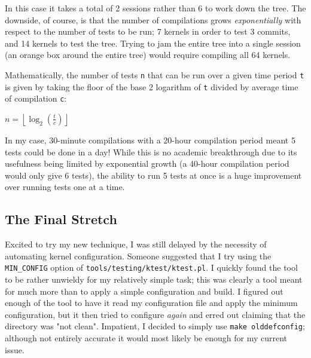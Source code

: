 \documentclass{article}
\begin{document}
In this case it takes a total of 2 sessions rather than 6 to work down the tree.  The downside, of course, is that the number of compilations grows \emph{exponentially} with respect to the number of tests to be run; 7 kernels in order to test 3 commits, and 14 kernels to test the tree.  Trying to jam the entire tree into a single session (an orange box around the entire tree) would require compiling all 64 kernels.

Mathematically, the number of tests \texttt{n} that can be run over a given time period \texttt{t} is given by taking the floor of the base 2 logarithm of \texttt{t} divided by average time of compilation \texttt{c}:
\begin{center}
\begin{makeimage}
	$n = \left \lfloor \log_2(\frac{t}{c}) \right \rfloor$
\end{makeimage}
\end{center}
In my case, 30-minute compilations with a 20-hour compilation period meant 5 tests could be done in a day!  While this is no academic breakthrough due to its usefulness being limited by exponential growth (a 40-hour compilation period would only give 6 tests), the ability to run 5 tests at once is a huge improvement over running tests one at a time.

\subsection{The Final Stretch}
Excited to try my new technique, I was still delayed by the necessity of automating kernel configuration.  Someone suggested that I try using the \texttt{MIN_CONFIG} option of \texttt{tools/testing/ktest/ktest.pl}.  I quickly found the tool to be rather unwieldy for my relatively simple task; this was clearly a tool meant for much more than to apply a simple configuration and build.  I figured out enough of the tool to have it read my configuration file and apply the minimum configuration, but it then tried to configure \emph{again} and erred out claiming that the directory was "not clean".  Impatient, I decided to simply use \texttt{make olddefconfig}; although not entirely accurate it would most likely be enough for my current issue.
\end{document}
